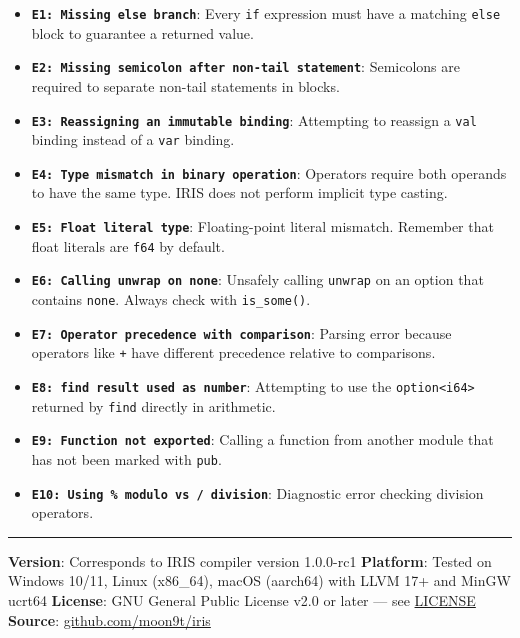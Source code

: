 \documentclass[
  english,
]{book}
\providecommand{\tightlist}{%
  \setlength{\itemsep}{0pt}\setlength{\parskip}{0pt}}
\begin{document}
\begin{itemize}
\tightlist
\item
  \textbf{\texttt{E1:\ Missing\ else\ branch}}: Every \texttt{if}
  expression must have a matching \texttt{else} block to guarantee a
  returned value.
\item
  \textbf{\texttt{E2:\ Missing\ semicolon\ after\ non-tail\ statement}}:
  Semicolons are required to separate non-tail statements in blocks.
\item
  \textbf{\texttt{E3:\ Reassigning\ an\ immutable\ binding}}: Attempting
  to reassign a \texttt{val} binding instead of a \texttt{var} binding.
\item
  \textbf{\texttt{E4:\ Type\ mismatch\ in\ binary\ operation}}:
  Operators require both operands to have the same type. IRIS does not
  perform implicit type casting.
\item
  \textbf{\texttt{E5:\ Float\ literal\ type}}: Floating-point literal
  mismatch. Remember that float literals are \texttt{f64} by default.
\item
  \textbf{\texttt{E6:\ Calling\ unwrap\ on\ none}}: Unsafely calling
  \texttt{unwrap} on an option that contains \texttt{none}. Always check
  with \texttt{is\_some()}.
\item
  \textbf{\texttt{E7:\ Operator\ precedence\ with\ comparison}}: Parsing
  error because operators like \texttt{+} have different precedence
  relative to comparisons.
\item
  \textbf{\texttt{E8:\ find\ result\ used\ as\ number}}: Attempting to
  use the \texttt{option\textless{}i64\textgreater{}} returned by
  \texttt{find} directly in arithmetic.
\item
  \textbf{\texttt{E9:\ Function\ not\ exported}}: Calling a function
  from another module that has not been marked with \texttt{pub}.
\item
  \textbf{\texttt{E10:\ Using\ \%\ modulo\ vs\ /\ division}}: Diagnostic
  error checking division operators.
\end{itemize}

\begin{center}\rule{0.5\linewidth}{0.5pt}\end{center}

\textbf{Version}: Corresponds to IRIS compiler version 1.0.0-rc1
\textbf{Platform}: Tested on Windows 10/11, Linux (x86\_64), macOS
(aarch64) with LLVM 17+ and MinGW ucrt64 \textbf{License}: GNU General
Public License v2.0 or later --- see \url{LICENSE} \textbf{Source}:
\href{https://github.com/moon9t/iris}{github.com/moon9t/iris}

\backmatter
\end{document}
